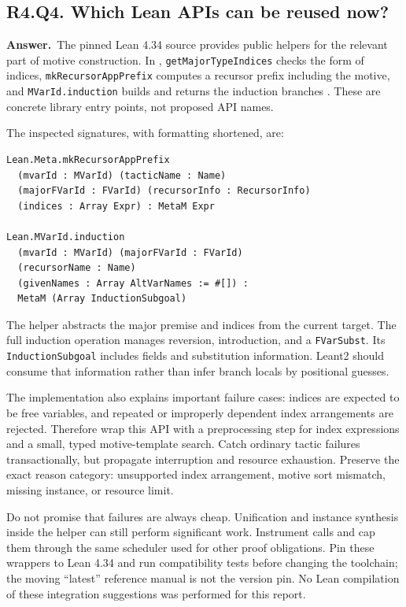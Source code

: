 \documentclass[11pt,a4paper]{article}
\theoremstyle{definition}
\theoremstyle{remark}
\newcommand{\code}[1]{\texttt{#1}}
\newcommand{\answer}{\par\noindent\textbf{Answer.}\ }
\newcommand{\qheading}[2]{\subsection{#1. #2}}
\begin{document}
\qheading{R4.Q4}{Which Lean APIs can be reused now?}
\answer The pinned Lean 4.34 source provides public helpers for the relevant
part of motive construction. In ,
\code{getMajorTypeIndices} checks the form of indices,
\code{mkRecursorAppPrefix} computes a recursor prefix including the motive,
and \code{MVarId.induction} builds and returns the induction branches
\cite{leanind}. These are concrete library entry points, not proposed API names.

The inspected signatures, with formatting shortened, are:
\par\noindent\begin{minipage}{\linewidth}
\begin{lstlisting}
Lean.Meta.mkRecursorAppPrefix
  (mvarId : MVarId) (tacticName : Name)
  (majorFVarId : FVarId) (recursorInfo : RecursorInfo)
  (indices : Array Expr) : MetaM Expr

Lean.MVarId.induction
  (mvarId : MVarId) (majorFVarId : FVarId)
  (recursorName : Name)
  (givenNames : Array AltVarNames := #[]) :
  MetaM (Array InductionSubgoal)
\end{lstlisting}
\end{minipage}\par
The helper abstracts the major premise and indices from the current target.
The full induction operation manages reversion, introduction, and a
\code{FVarSubst}. Its \code{InductionSubgoal} includes fields and substitution
information. Leant2 should consume that information rather than infer branch
locals by positional guesses.

The implementation also explains important failure cases: indices are expected
to be free variables, and repeated or improperly dependent index arrangements
are rejected. Therefore wrap this API with a preprocessing step for index
expressions and a small, typed motive-template search. Catch ordinary tactic
failures transactionally, but propagate interruption and resource exhaustion.
Preserve the exact reason category: unsupported index arrangement, motive
sort mismatch, missing instance, or resource limit.

Do not promise that failures are always cheap. Unification and instance
synthesis inside the helper can still perform significant work. Instrument
calls and cap them through the same scheduler used for other proof obligations.
Pin these wrappers to Lean 4.34 and run compatibility tests before changing the
toolchain; the moving ``latest'' reference manual is not the version pin.
No Lean compilation of these integration suggestions was performed for this
report.
\end{document}
